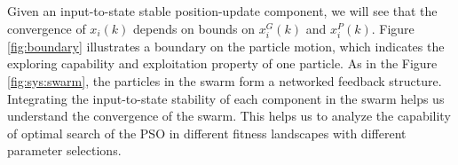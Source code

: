 \documentclass[phd]{byuprop}
\begin{document}
\begin{appendices}
Given an input-to-state stable position-update component, we will see that the convergence of $ x_{i}(k) $ depends on bounds on $ x^{G}_{i}(k) $ and $ x^{P}_{i}(k) $.
Figure \ref{fig:boundary} illustrates a boundary on the particle motion, which indicates the exploring capability and exploitation property of one particle.
As in the Figure \ref{fig:sys:swarm}, the particles in the swarm form a networked feedback structure.
Integrating the input-to-state stability of each component in the swarm helps us understand the convergence of the swarm.
This helps us to analyze the capability of optimal search of the PSO in different fitness landscapes with different parameter selections.

\end{appendices}



\end{document}
